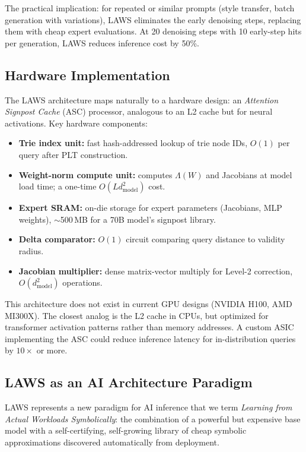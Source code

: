 \documentclass[11pt]{article}
\begin{document}
The practical implication: for repeated or similar prompts (style transfer,
batch generation with variations), LAWS eliminates the early denoising steps,
replacing them with cheap expert evaluations.  At 20 denoising steps with
10 early-step hits per generation, LAWS reduces inference cost by 50\%.

\subsection{Hardware Implementation}

The LAWS architecture maps naturally to a hardware design: an
\emph{Attention Signpost Cache} (ASC) processor, analogous to an L2 cache
but for neural activations.  Key hardware components:

\begin{itemize}[leftmargin=2em]
  \item \textbf{Trie index unit:} fast hash-addressed lookup of trie node IDs,
        $O(1)$ per query after PLT construction.
  \item \textbf{Weight-norm compute unit:} computes $\Lambda(W)$ and Jacobians
        at model load time; a one-time $O(Ld_{\mathrm{model}}^2)$ cost.
  \item \textbf{Expert SRAM:} on-die storage for expert parameters
        (Jacobians, MLP weights), $\sim$500\,MB for a 70B model's signpost library.
  \item \textbf{Delta comparator:} $O(1)$ circuit comparing query distance
        to validity radius.
  \item \textbf{Jacobian multiplier:} dense matrix-vector multiply for Level-2
        correction, $O(d_{\mathrm{model}}^2)$ operations.
\end{itemize}

This architecture does not exist in current GPU designs (NVIDIA H100, AMD MI300X).
The closest analog is the L2 cache in CPUs, but optimized for transformer
activation patterns rather than memory addresses.  A custom ASIC implementing
the ASC could reduce inference latency for in-distribution queries by $10\times$
or more.

\subsection{LAWS as an AI Architecture Paradigm}

LAWS represents a new paradigm for AI inference that we term
\emph{Learning from Actual Workloads Symbolically}: the combination of a powerful
but expensive base model with a self-certifying, self-growing library of
cheap symbolic approximations discovered automatically from deployment.
\end{document}
